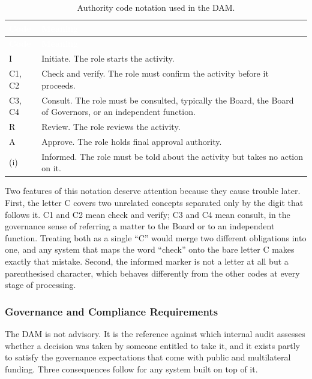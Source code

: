 \begin{longtable}{|p{}|p{}|}
\caption{Authority code notation used in the DAM.}\label{tab:codes}\\
\hline
\rowcolor{myblue}\textcolor{white}{\textbf{Code}} & \textcolor{white}{\textbf{Meaning}} \\
\hline
\endfirsthead
\hline
\rowcolor{myblue}\textcolor{white}{\textbf{Code}} & \textcolor{white}{\textbf{Meaning}} \\
\hline
\endhead
I & Initiate. The role starts the activity. \\ \hline
C1, C2 & Check and verify. The role must confirm the activity before it proceeds. \\ \hline
C3, C4 & Consult. The role must be consulted, typically the Board, the Board of Governors, or an independent function. \\ \hline
R & Review. The role reviews the activity. \\ \hline
A & Approve. The role holds final approval authority. \\ \hline
(i) & Informed. The role must be told about the activity but takes no action on it. \\ \hline
\end{longtable}

Two features of this notation deserve attention because they cause trouble later. First, the letter C covers two unrelated concepts separated only by the digit that follows it. C1 and C2 mean check and verify; C3 and C4 mean consult, in the governance sense of referring a matter to the Board or to an independent function. Treating both as a single ``C'' would merge two different obligations into one, and any system that maps the word ``check'' onto the bare letter C makes exactly that mistake. Second, the informed marker is not a letter at all but a parenthesised character, which behaves differently from the other codes at every stage of processing.

\subsubsection{Governance and Compliance Requirements}

The DAM is not advisory. It is the reference against which internal audit assesses whether a decision was taken by someone entitled to take it, and it exists partly to satisfy the governance expectations that come with public and multilateral funding. Three consequences follow for any system built on top of it.

